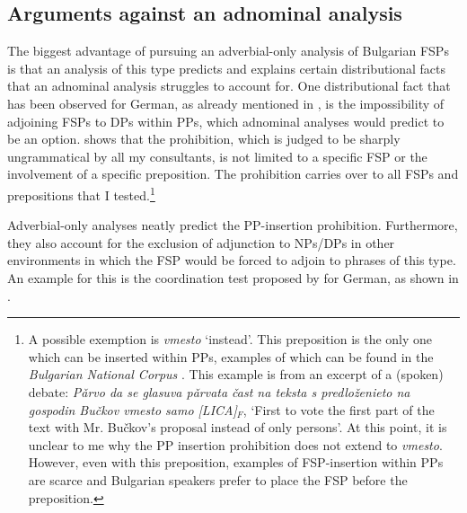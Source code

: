 \documentclass[output=paper,colorlinks,citecolor=brown]{langscibook}
\begin{document}
\subsection{Arguments against an adnominal analysis}\label{sec:3.1}
The biggest advantage of pursuing an adverbial-only analysis of Bulgarian FSPs is that an analysis of this type predicts and explains certain distributional facts that an adnominal analysis struggles to account for. One distributional fact that has been observed for German, as already mentioned in , is the impossibility of adjoining FSPs to DPs within PPs, which adnominal analyses would predict to be an option.  shows that the prohibition, which is judged to be sharply ungrammatical by all my consultants, is not limited to a specific FSP or the involvement of a specific preposition. The prohibition carries over to all FSPs and prepositions that I tested.\footnote{A possible exemption is \textit{vmesto} `instead'. This preposition is the only one which can be inserted within PPs, examples of which can be found in the \textit{Bulgarian National Corpus} \citep{KoevaBNC}. This example is from an excerpt of a (spoken) debate: \textit{P\v{a}rvo da se glasuva p\v{a}rvata \v{c}ast na teksta s predlo\v{z}enieto na gospodin Bu\v{c}kov vmesto samo [LICA]$_{F}$}, `First to vote the first part of the text with Mr. Bu\v{c}kov's proposal instead of only persons'. At this point, it is unclear to me why the PP insertion prohibition does not extend to \textit{vmesto}. However, even with this preposition, examples of FSP-insertion within PPs are scarce and Bulgarian speakers prefer to place the FSP before the preposition.}

\ea\label{Bulgarianprepositions1}
\z
\z 

\noindent Adverbial-only analyses neatly predict the PP-insertion prohibition. Furthermore, they also account for the exclusion of adjunction to NPs/DPs in other environments in which the FSP would be forced to adjoin to phrases of this type. An example for this is the coordination test proposed by \citet{Jacobs1983} for German, as shown in .
\end{document}
